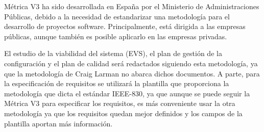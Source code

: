 \pagebreak
\par Métrica V3 ha sido desarrollada en España por el Ministerio de Administraciones Públicas, debido a la necesidad de estandarizar una metodología para el desarrollo de proyectos software. Principalmente, está dirigida a las empresas públicas, aunque también es posible aplicarlo en las empresas privadas.
\par El estudio de la viabilidad del sistema (EVS), el plan de gestión de la configuración y el plan de calidad será redactados siguiendo esta metodología, ya que la metodología de Craig Larman no abarca dichos documentos. A parte, para la especificación de requisitos se utilizará la plantilla que proporciona la metodología que dicta el estándar IEEE-830, ya que aunque se puede seguir la Métrica V3 para  especificar los requisitos, es más conveniente usar la otra metodología ya que los requisitos quedan mejor definidos y los campos de la plantilla aportan más información.
